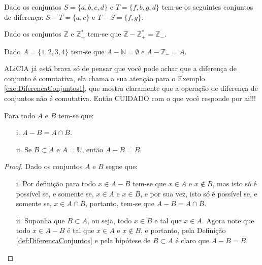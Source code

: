 \begin{exemplo}\label{exe:DiferencaConjuntos1}
	Dado os conjuntos $S = \{a, b, c, d\}$ e $T = \{f, b, g, d\}$ tem-se os seguintes conjuntos de diferença: $S - T = \{a, c\}$ e $T - S = \{f, g\}$.
\end{exemplo}

\begin{exemplo}\label{exe:DiferencaConjuntos2}
	Dado os conjuntos $\mathbb{Z}$ e $\mathbb{Z}_+^*$ tem-se que $\mathbb{Z} - \mathbb{Z}_+^* = \mathbb{Z}_-$.
\end{exemplo}

\begin{exemplo}\label{exe:DiferencaConjuntos3}
  Dado $A = \{1, 2, 3, 4\}$ tem-se que $A - \mathbb{N} = \emptyset$ e $A - \mathbb{Z}_{-} = A$. 
\end{exemplo}

\begin{cuidado}\label{warn:NaoComutatividadeDiferenca}
  ALiCIA já está brava só de pensar que você pode achar que a diferença de conjunto é comutativa, ela chama a sua atenção para o Exemplo \ref{exe:DiferencaConjuntos1}, que mostra claramente que a operação de diferença de conjuntos não é comutativa. Então {\color{red}CUIDADO} com o que você responde por ai!!!
\end{cuidado}

\begin{teorema}\label{teo:BasicoDiferencaConjuntos}
	Para todo $A$ e $B$ tem-se que:
	\begin{itemize}
		\item[i.] $A - B = A \cap \overline{B}$.
		\item[ii.] Se $B \subset A$  e $A = \mathbb{U}$, então $A - B = \overline{B}$.
	\end{itemize}
\end{teorema}

\begin{proof}
	Dado os conjuntos $A$ e $B$ segue que:
	\begin{itemize}
		\item[i.] Por definição para todo $x \in A - B$ tem-se que $x \in A$ e $x \notin B$, mas isto só é possível se, e somente se, $x \in A$ e $x \in \overline{B}$, e por sua vez, isto só é possível se, e somente se, $x \in A \cap \overline{B}$, portanto, tem-se que $A - B = A \cap \overline{B}$.
		\item[ii.] Suponha que $B \subset A$, ou seja, todo $x \in B$ e tal que $x \in A$. Agora note que todo $x \in A - B$ é tal que $x \in A$ e $x \notin B$, e portanto, pela Definição \ref{def:DiferencaConjuntos} e pela hipótese de $B \subset A$ é claro que $A - B = \overline{B}$.
	\end{itemize}
\end{proof}

